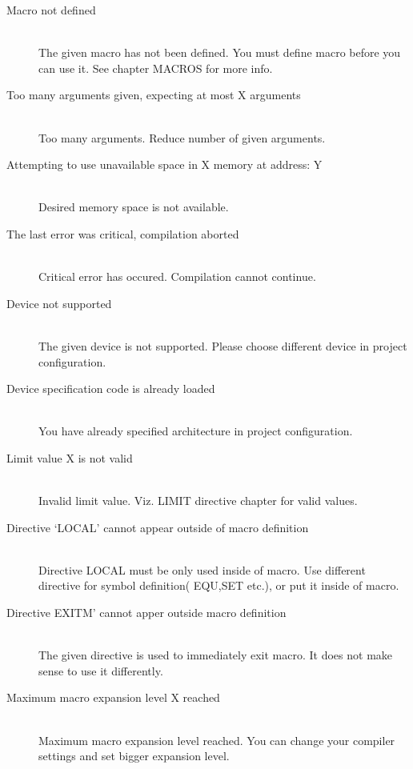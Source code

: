 \begin{description}
                    \item[Macro not defined ] \hfill \\
                    The given macro has not been defined. You must define macro before you can use it. See chapter MACROS for more info.
                    \item[Too many arguments given, expecting at most X arguments] \hfill \\             
                    Too many arguments. Reduce number of given arguments.
                    \item[Attempting to use unavailable space in X memory at address: Y ] \hfill \\  
                    Desired memory space is not available.
                    \item[The last error was critical, compilation aborted] \hfill \\                   
                    Critical error has occured. Compilation cannot continue.
                    \item[Device not supported] \hfill \\
                    The given device is not supported. Please choose different device in project configuration.
                    \item[Device specification code is already loaded ] \hfill \\                       
                    You have already specified architecture in project configuration.
                    \item[Limit value X is not valid] \hfill \\
                    Invalid limit value. Viz. LIMIT directive chapter for valid values.
                    \item[Directive `LOCAL' cannot appear outside of macro definition ] \hfill \\   
                    Directive LOCAL must be only used inside of macro. Use different directive for symbol definition( EQU,SET etc.), or put it inside of macro.
                    \item[Directive EXITM' cannot apper outside macro definition] \hfill \\
                    The given directive is used to immediately exit macro. It does not make sense to use it differently.
                    \item[Maximum macro expansion level X reached  ] \hfill \\
                    Maximum macro expansion level reached. You can change your compiler settings and set bigger expansion level.

\end{description}
